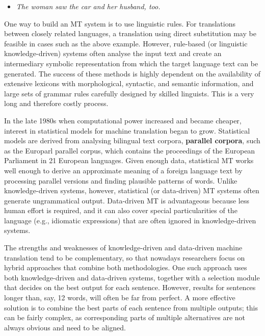 \begin{multicols}{2}
\begin{itemize}
\item {\it The woman saw the car and her husband, too.}
\end{itemize}

One way to build an MT system is to use linguistic rules. For translations between closely related languages, a translation using direct substitution may be feasible in cases such as the above example. However, rule-based (or linguistic knowledge-driven) systems often analyse the input text and create an intermediary symbolic representation from which the target language text can be generated. The success of these methods is highly dependent on the availability of extensive lexicons with morphological, syntactic, and semantic information, and large sets of grammar rules carefully designed by skilled linguists. This is a very long and therefore costly process.

In the late 1980s when computational power increased and became cheaper, interest in statistical models for machine translation began to grow. Statistical models are derived from analysing bilingual text corpora, \textbf{parallel corpora}, such as the Europarl parallel corpus, which contains the proceedings of the European Parliament in 21 European languages. Given enough data, statistical MT works well enough to derive an approximate meaning of a foreign language text by processing parallel versions and finding plausible patterns of words. Unlike knowledge-driven systems, however, statistical (or data-driven) MT systems often generate ungrammatical output. Data-driven MT is advantageous because less human effort is required, and it can also cover special particularities of the language (e.g., idiomatic expressions) that are often ignored in knowledge-driven systems. 

The strengths and weaknesses of knowledge-driven and data-driven machine translation tend to be complementary, so that nowadays researchers focus on hybrid approaches that combine both methodologies. One such approach uses both knowledge-driven and data-driven systems, together with a selection module that decides on the best output for each sentence. However, results for sentences longer than, say, 12 words, will often be far from perfect. A more effective solution is to combine the best parts of each sentence from multiple outputs; this can be fairly complex, as corresponding parts of multiple alternatives are not always obvious and need to be aligned. 



\end{multicols}
